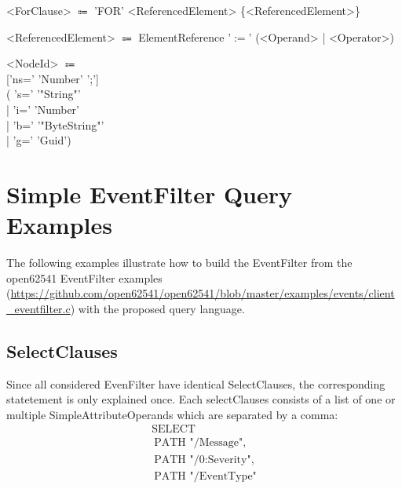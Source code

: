 \documentclass[10pt]{scrreprt}
\begin{document}
\begin{tabbing}
<ForClause> $\Coloneqq$ 'FOR' <ReferencedElement> \{<ReferencedElement>\}
\end{tabbing}
\begin{tabbing}
<ReferencedElement> $\Coloneqq$ ElementReference '$:=$' (<Operand> | <Operator>)
\end{tabbing}
\begin{tabbing}
<NodeId> $\Coloneqq$ \\ \hspace{10mm} ['ns=' 'Number' ';']
\\ \hspace{10mm} ( 's=' '"String"'
\\ \hspace{10mm} | 'i=' 'Number'
\\ \hspace{10mm} | 'b=' '"ByteString"'
\\ \hspace{10mm} | 'g=' 'Guid')
\end{tabbing}



\section{Simple EventFilter Query Examples}
The following examples illustrate how to build the EventFilter from the open62541 EventFilter examples
(\url{https://github.com/open62541/open62541/blob/master/examples/events/client_eventfilter.c})
with the proposed query language.

\subsection{SelectClauses}
\label{SelectClauses}

Since all considered EvenFilter have identical SelectClauses, the corresponding
statetement is only explained once. Each selectClauses consists of a list of one or multiple SimpleAttributeOperands
which are separated by a comma:
\begin{equation}
    \label{eq:1}
    \begin{split}
        \text{SELECT } \\\
        \text{PATH "/Message",} \\\
        \text{PATH "/0:Severity",} \\\
        \text{PATH "/EventType"}
    \end{split}
\end{equation}
\end{document}
